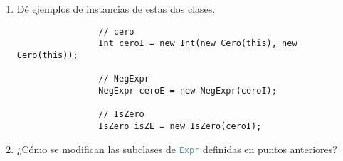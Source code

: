 \documentclass{article}
\newcommand{\tx}[1]{\textcolor{CadetBlue} {\texttt{#1}}}
\begin{document}
\begin{enumerate}
\begin{enumerate}
\begin{itemize}
\begin{verbatim}
                        /**
                        * $p \land q = \neg(\neg p \lor \neg q)$
                        */
                        Boolean and(Boolean p) {return this.not().or(p.not()).not();}
                    }

                    // modificaciones para Nat
                    class Nat extends Object {
                        ...
                        /**
                        * $a = b \iff a \leq b \land b \leq a$
                        */
                        Nat eq(Nat n) {return this.leq(n).and(n.leq(this));}
                        ...
                    }

                    // modificacioes para Int
                    class Int extends Object {
                        ...
                        Booelan isZero(Int i) {return this.i.eq(this.d);}
                        ...
                    }
                \end{verbatim}

                Y se usa este método para 

                \begin{verbatim}
                    class IsZero extends Expr {
                        Expr e;

                        IsZero(Expr e) {super(); this.e = e;}

                        Boolean isAtom() {return (new Booelan(new Nat(this))).false();}

                        Expr eval() {return new BoolExpr(e.eval().v.isZero());}
                    }
                \end{verbatim}
            \end{itemize}

            \item Dé ejemplos de instancias de estas dos clases.

            \begin{verbatim}
                // cero
                Int ceroI = new Int(new Cero(this), new Cero(this));

                // NegExpr
                NegExpr ceroE = new NegExpr(ceroI);

                // IsZero
                IsZero isZE = new IsZero(ceroI);
            \end{verbatim}

            \item ¿Cómo se modifican las subclases de \tx{Expr} definidas en
            puntos anteriores?


\end{enumerate}
\end{enumerate}
\end{document}
